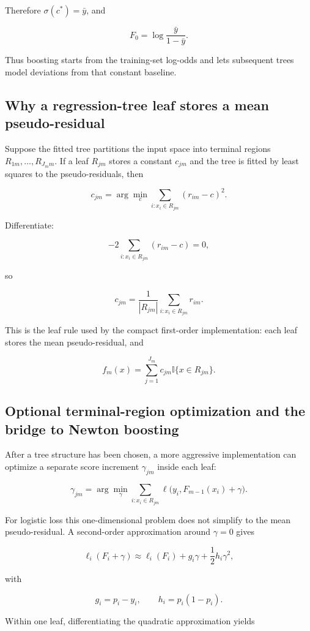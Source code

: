 \documentclass[11pt]{article}
\newcommand{\ind}{\mathbb{1}}
\renewcommand{\ind}{\mathbb{I}}
\begin{document}
Therefore $\sigma(c^*)=\bar y$, and

\[
 \boxed{F_0=\log\frac{\bar y}{1-\bar y}}.
\]

Thus boosting starts from the training-set log-odds and lets subsequent trees
model deviations from that constant baseline.

\subsection{Why a regression-tree leaf stores a mean pseudo-residual}

Suppose the fitted tree partitions the input space into terminal regions
$R_{1m},\ldots,R_{J_m m}$. If a leaf $R_{jm}$ stores a constant $c_{jm}$ and the
tree is fitted by least squares to the pseudo-residuals, then

\[
 c_{jm}
 =\arg\min_c\sum_{i:x_i\in R_{jm}}(r_{im}-c)^2.
\]

Differentiate:

\[
 -2\sum_{i:x_i\in R_{jm}}(r_{im}-c)=0,
\]

so

\[
 \boxed{c_{jm}
 =\frac{1}{|R_{jm}|}\sum_{i:x_i\in R_{jm}}r_{im}}.
\]

This is the leaf rule used by the compact first-order implementation: each leaf
stores the mean pseudo-residual, and

\[
 f_m(x)=\sum_{j=1}^{J_m}c_{jm}\ind\{x\in R_{jm}\}.
\]

\subsection{Optional terminal-region optimization and the bridge to Newton boosting}

After a tree structure has been chosen, a more aggressive implementation can
optimize a separate score increment $\gamma_{jm}$ inside each leaf:

\[
 \gamma_{jm}
 =\arg\min_\gamma
 \sum_{i:x_i\in R_{jm}}
 \ell\bigl(y_i,F_{m-1}(x_i)+\gamma\bigr).
\]

For logistic loss this one-dimensional problem does not simplify to the mean
pseudo-residual. A second-order approximation around $\gamma=0$ gives

\[
 \ell_i(F_i+\gamma)
 \approx \ell_i(F_i)+g_i\gamma+\frac12h_i\gamma^2,
\]

with

\[
 g_i=p_i-y_i,
 \qquad
 h_i=p_i(1-p_i).
\]

Within one leaf, differentiating the quadratic approximation yields
\end{document}
